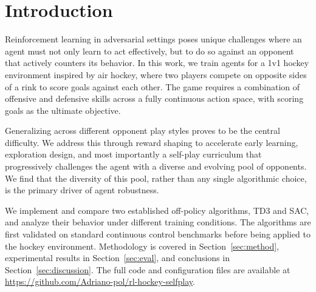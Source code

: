 \section{Introduction}\label{sec:intro}

Reinforcement learning in adversarial settings poses unique challenges where an agent 
must not only learn to act effectively, but to do so against an opponent that actively 
counters its behavior. In this work, we train agents for a 1v1 hockey environment 
inspired by air hockey, where two players compete on opposite sides of a rink to 
score goals against each other. The game requires a combination of offensive and 
defensive skills across a fully continuous action space, with scoring goals as 
the ultimate objective.

\medskip
Generalizing across different opponent play styles proves to be the central difficulty. 
We address this through reward shaping to accelerate early learning, exploration 
design, and most importantly a self-play curriculum that progressively challenges the 
agent with a diverse and evolving pool of opponents. We find that the diversity of 
this pool, rather than any single algorithmic choice, is the primary driver of 
agent robustness.

\medskip
We implement and compare two established off-policy algorithms, \ac{TD3} and \ac{SAC}, 
and analyze their behavior under different training conditions. The algorithms are first 
validated on standard continuous control benchmarks before being applied to the hockey 
environment. Methodology is covered in Section~\ref{sec:method}, experimental results 
in Section~\ref{sec:eval}, and conclusions in Section~\ref{sec:discussion}. 
The full code and configuration files are available at 
\url{https://github.com/Adriano-pol/rl-hockey-selfplay}.
